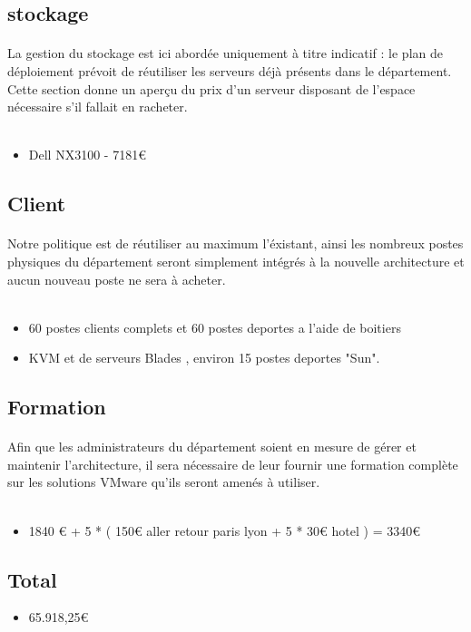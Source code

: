 \subsection{stockage}

\paragraph{} La gestion du stockage est ici abordée uniquement à titre indicatif : le plan de déploiement prévoit de réutiliser les serveurs déjà présents dans le département. Cette section donne un aperçu du prix d'un serveur disposant de l'espace nécessaire s'il fallait en racheter.
\\~
\begin{itemize}
 	\item Dell NX3100 - 7181€
\end{itemize}

\subsection{Client}

\paragraph{} Notre politique est de réutiliser au maximum l'éxistant, ainsi les nombreux postes physiques du département seront simplement intégrés à la nouvelle architecture et aucun nouveau poste ne sera à acheter.
\\~
\begin{itemize}
	\item 60 postes clients complets et 60 postes deportes a l'aide de boitiers
	\item KVM et de serveurs Blades , environ 15 postes deportes "Sun".
\end{itemize}

\subsection{Formation}

\paragraph{} Afin que les administrateurs du département soient en mesure de gérer et maintenir l'architecture, il sera nécessaire de leur fournir une formation complète sur les solutions VMware qu'ils seront amenés à utiliser.
\\~
\begin{itemize}
	\item 1840 € + 5 * ( 150€ aller retour paris lyon + 5 * 30€ hotel ) = 3340€
\end{itemize}


\subsection{Total}

\begin{itemize}
	\item 65.918,25€
\end{itemize}